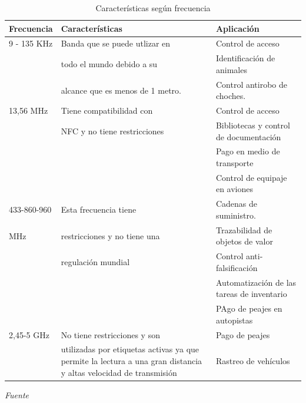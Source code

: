 \documentclass[11pt,openany]{book}
\newcounter{ns}
\begin{document}
	\begin{table}[htbp]
		\centering
		\begin{tabular}{|p{2cm}|p{5cm}|p{6cm}|}\hline
			\textbf{Frecuencia} & \textbf{Características} & \textbf{Aplicación}\\ \hline
			9 - 135 KHz & Banda que se puede utlizar en   & Control de acceso\\
			& todo el mundo debido a su & Identificación de animales\\
			 & alcance que es menos de 1 metro. & Control antirobo de choches.\\ \hline
			 13,56 MHz & Tiene compatibilidad con  & Control de acceso\\
			  & NFC y no tiene restricciones & Bibliotecas y control de documentación\\
			   & & Pago en medio de transporte \\
			   & & Control de equipaje en aviones\\ \hline
			   433-860-960 & Esta frecuencia tiene & Cadenas de suministro. \\
			    MHz & restricciones y no tiene una  & Trazabilidad de objetos de valor\\
			    & regulación mundial & Control anti-falsificación\\
			    & & Automatización de las tareas de inventario \\
			    & & PAgo de peajes en autopistas\\ \hline
			    2,45-5 GHz & No tiene restricciones y son & Pago de peajes\\
			    & utilizadas por etiquetas activas ya que permite la lectura a una gran distancia y altas velocidad de transmisión & Rastreo de vehículos\\ \hline
		\end{tabular}
		\caption{ Características según frecuencia}
		\textsl{Fuente \cite{Cherrez2010,garde2016}}
	\end{table}
\end{document}
